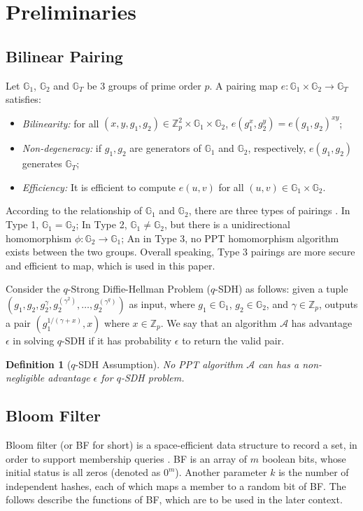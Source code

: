 \documentclass[conference]{IEEEtran}
\newtheorem{definition}{Definition}
\begin{document}
\section{Preliminaries}\label{sec:preliminary}

\subsection{Bilinear Pairing}
Let $\mathbb{G}_1$, $\mathbb{G}_2$ and $\mathbb{G}_T$ be 3 groups of prime order $p$. A pairing map $e:\mathbb{G}_1\times \mathbb{G}_2\rightarrow\mathbb{G}_T$ satisfies:
\begin{itemize}
	\item \textit{Bilinearity:} for all $(x,y, g_1, g_2) \in \mathbb{Z}_p^2\times \mathbb{G}_1\times \mathbb{G}_2$, $e(g_1^x, g_2^y) = e(g_1, g_2)^{xy}$;
	\item \textit{Non-degeneracy:} if $g_1, g_2$ are generators of $\mathbb{G}_1$ and $\mathbb{G}_2$, respectively, $e(g_1, g_2)$ generates $\mathbb{G}_T$;
	\item \textit{Efficiency:} It is efficient to compute $e(u,v)$ for all $(u, v) \in \mathbb{G}_1\times \mathbb{G}_2$.
\end{itemize}

According to the relationship of $\mathbb{G}_1$ and $\mathbb{G}_2$, there are three types of pairings \cite{GALBRAITH20083113}. 
In Type 1, $\mathbb{G}_1 = \mathbb{G}_2$; In Type 2, $\mathbb{G}_1 \neq \mathbb{G}_2$, but there is a unidirectional homomorphism $\phi:\mathbb{G}_2 \rightarrow \mathbb{G}_1$; An in Type 3, no PPT homomorphism algorithm exists between the two groups.
Overall speaking, Type 3 pairings are more secure and efficient to map, which is used in this paper.

Consider the $q$-Strong Diffie-Hellman Problem ($q$-SDH) as follows: given a tuple $(g_1, g_2, g_2^{\gamma}, g_2^{(\gamma^2)}, \dots, g_2^{(\gamma^q)})$ as input, where $g_1\in\mathbb{G}_1$, $g_2\in\mathbb{G}_2$, and $\gamma\in \mathbb{Z}_p$, outputs a pair $(g_1^{1/(\gamma + x)}, x)$ where $x \in \mathbb{Z}_p$. We say that an algorithm $\mathcal{A}$ has advantage $\epsilon$ in solving $q$-SDH if it has probability $\epsilon$ to return the valid pair.

\begin{definition}[$q$-SDH Assumption]
	No PPT algorithm $\mathcal{A}$ can has a non-negligible advantage $\epsilon$ for $q$-SDH problem.
\end{definition}


\subsection{Bloom Filter}\label{section:bf}
Bloom filter (or BF for short) is a space-efficient data structure to record a set, in order to support membership queries \cite{Bloom1970, broder2004network}.
BF is an array of $m$ boolean bits, whose initial status is all zeros (denoted as $0^m$). Another parameter $k$ is the number of independent hashes, each of which maps a member to a random bit of BF. The follows describe the functions of BF, which are to be used in the later context.
\end{document}
